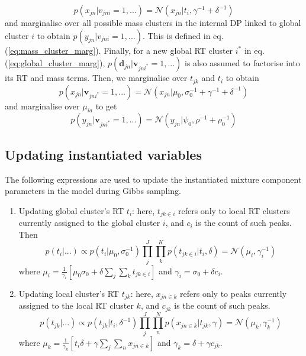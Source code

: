\begin{enumerate}
\begin{dmath}
p(x_{jn} \vert v_{jni}=1,...)=\mathcal{N}(x_{jn} \vert t_{i},\gamma^{-1}+\delta^{-1})
\label{eq:existing_global_factors}
\end{dmath}
and marginalise over all possible mass clusters in the internal DP linked to global cluster $i$ to obtain $p(y_{jn} \vert v_{jni}=1,...)$. This is defined in eq. (\ref{eq:mass_cluster_marg}). Finally, for a new global RT cluster $i^{*}$ in eq. (\ref{eq:global_cluster_marg}), $p(\mathbf{d}_{jn} \vert \boldsymbol{v}_{jni^{*}}=1,...)$ is also assumed to factorise into its RT and mass terms. Then, we marginalise over $t_{jk}$ and $t_{i}$ to obtain
\begin{dmath}
p(x_{jn} \vert \boldsymbol{v}_{jni^{*}}=1,...)=\mathcal{N}(x_{jn} \vert \mu_{0},\sigma_{0}^{-1}+\gamma^{-1}+\delta^{-1})
\end{dmath}
and marginalise over $\mu_{ia}$ to get 
\begin{dmath}
p(y_{jn} \vert \boldsymbol{v}_{jni^{*}}=1,...)=\mathcal{N}(y_{jn} \vert \psi_{0},\rho^{-1}+\rho_{0}^{-1})
\end{dmath}

\end{enumerate}

\subsection{Updating instantiated variables}

The following expressions are used to update the instantiated mixture component parameters in the model during Gibbs sampling.
\begin{enumerate}
\item Updating global cluster's RT $t_{i}$: here, $t_{jk\in i}$ refers only to local RT clusters currently assigned to the global cluster $i$, and $c_{i}$ is the count of such peaks. Then
\begin{dmath}
p(t_{i} \vert ...)\propto p(t_{i} \vert \mu_{0},\sigma_{0}^{-1})\prod_{j}^{J}\prod_{k}^{K}p(t_{jk\in i} \vert t_{i},\delta)=\mathcal{N}(\mu_{i},\gamma_{i}^{-1})
\end{dmath}
where $\mu_{i}=\frac{1}{\gamma_{i}}\left[\mu_{0}\sigma_{0}+\delta\sum_{j}\sum_{k}t_{jk\in i}\right]$ and $\gamma_{i}=\sigma_{0}+\delta c_{i}$. 
\item Updating local cluster's RT $t_{jk}$: here, $x_{jn\in k}$ refers only to peaks currently assigned to the local RT cluster $k$, and
$c_{jk}$ is the count of such peaks.
\begin{dmath}
p(t_{jk} \vert ...)\propto p(t_{jk} \vert t_{i},\delta^{-1})\prod_{j}^{J}\prod_{n}^{N}p(x_{jn\in k} \vert t_{jk},\gamma)=\mathcal{N}(\mu_{k},\gamma_{k}^{-1})
\end{dmath}
where $\mu_{k}=\frac{1}{\gamma_{k}}\left[t_{i}\delta+\gamma\sum_{j}\sum_{n}x_{jn\in k}\right]$ and $\gamma_{k}=\delta+\gamma c_{jk}$. 
\end{enumerate}

